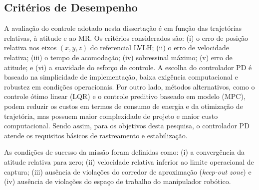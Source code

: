 \subsection{Critérios de Desempenho}
\label{sec:criterios_desempenho}

A avaliação do controle adotado nesta dissertação é em função das trajetórias relativas, à atitude e ao MR.
Os critérios considerados são:
(i) o erro de posição relativa nos eixos $(x,y,z)$ do referencial LVLH;  
(ii) o erro de velocidade relativa;  
(iii) o tempo de acomodação;  
(iv) sobressinal máximo;  
(v) erro de atitude;  
e (vi) a suavidade do esforço de controle.
A escolha do controlador PD é baseado na simplicidade de implementação, baixa exigência computacional e robustez em condições operacionais.
Por outro lado, métodos alternativos, como o controle ótimo linear (LQR) e o controle preditivo baseado em modelo (MPC), podem reduzir os custos em termos de consumo de energia e da otimização de trajetória, mas possuem maior complexidade de projeto e maior custo computacional.
Sendo assim, para os objetivos desta pesquisa, o controlador PD atende os requisitos básicos de rastreamento e estabilização.

As condições de sucesso da missão foram definidas como:  
(i) a convergência da atitude relativa para zero;  
(ii) velocidade relativa inferior ao limite operacional de captura;  
(iii) ausência de violações do corredor de aproximação (\emph{keep-out zone}) e 
(iv) ausência de violações do espaço de trabalho do manipulador robótico.  
